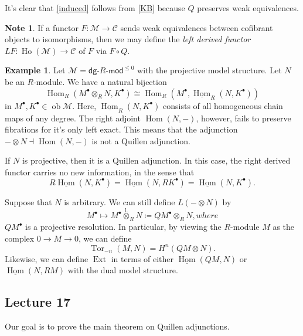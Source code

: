 \documentclass[10pt,letterpaper,cm]{nupset}
\theoremstyle{definition}
\newtheorem{exmp}[defn]{Example}
\newtheorem{note}[defn]{Note}
\theoremstyle{theorem}
\theoremstyle{remark}
\newcommand{\1}{\mathbb{1}}
\renewcommand{\c}{\mathcal{C}}
\newcommand{\m}{\mathcal{M}}
\newcommand{\dg}{\mathsf{dg}}
\newcommand{\0}{\vec 0}
\DeclareMathOperator{\tor}{Tor}
\DeclareMathOperator{\ho}{Ho}
\DeclareMathOperator{\ext}{Ext}
\DeclareMathOperator{\Hom}{Hom}
\DeclareMathOperator{\ob}{ob}
\begin{document}
It's clear that \cref{induced} follows from \cref{KB} because $Q$ preserves weak equivalences. 

\begin{note}
If a functor $F: \m \to \c$ sends weak equivalences between cofibrant objects to isomorphisms, then we may define the \textit{left derived functor} $L{F} : \ho(\m) \to \c$ of $F$ via $F \circ Q$.
\end{note}

\begin{exmp}
Let $\m =  \dg{\text{-}}R{\text{-}}\mathsf{mod}^{\leq 0}$ with the projective model structure. Let $N$ be an $R$-module. We have a natural bijection
\[
\Hom_R(M^{\bullet} \otimes_R N, K^{\bullet}) \cong \Hom_R(M^{\bullet}, \underline{\Hom}_R(N, K^{\bullet}))
\] in $M^{\bullet}, K^{\bullet} \in \ob{\m}$. Here, $\underline{\Hom}_R(N, K^{\bullet})$ consists of all homogeneous  chain maps of any degree.  The right adjoint $\Hom(N, {-})$, however, fails to preserve fibrations for it's only left exact. This means that the adjunction ${-} \otimes N \dashv \Hom(N, {-})$ is not a Quillen adjunction.

\medskip

If $N$ is projective, then it is a Quillen adjunction. In this case, the right derived functor carries no new information, in the sense that
\[
R{\underline{\Hom}(N, K^{\bullet})} = \underline{\Hom}(N, R{K^{\bullet}}) = \underline{\Hom}(N, K^{\bullet}) 
.\]

\medskip

Suppose that $N$ is arbitrary. We can still define $L\left({-} \otimes N\right)$ by
\[
M^{\bullet} \mapsto M^{\bullet} \overset{\mathbb{L}}{\otimes}_R N \coloneqq Q{M^{\bullet}} \otimes_R N, where
\] $Q{M^{\bullet}}$ is a projective resolution.  In particular, by viewing the $R$-module $M$ as the complex $0 \to M \to 0$, we can define
\[
\tor_{-n}(M,N) = H^n(Q{M} \otimes N).
\]
Likewise, we can define $\ext$ in terms of either $\underline{\Hom}(Q{M}, N)$ or $\underline{\Hom}(N, R{M})$ with the dual model structure. 

\end{exmp}

\subsection{Lecture 17}

Our goal is to prove the main theorem on Quillen adjunctions. 
\end{document}
